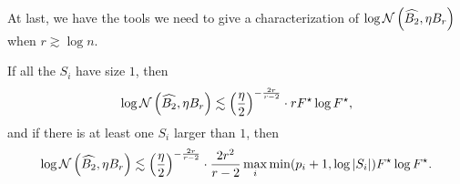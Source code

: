 \documentclass[11pt]{article}
\numberwithin{equation}{section}
\begin{document}
At last, we have the tools we need to give a characterization of $\log\mathcal{N}\left(\widehat{B_2},\eta B_r\right)$ when $r \gtrsim \log n$.

\begin{lemma}
\label{lemma:r_to_two_complicated}
If all the $S_i$ have size $1$, then
\begin{align*}
    \log\mathcal{N}\left(\widehat{B_2}, \eta B_r\right) \lesssim \left(\frac{\eta}{2}\right)^{-\frac{2r}{r-2}} \cdot rF^{\star}\log F^{\star},
\end{align*}
and if there is at least one $S_i$ larger than $1$, then
\begin{align*}
    \log\mathcal{N}\left(\widehat{B_2}, \eta B_r\right) \lesssim \left(\frac{\eta}{2}\right)^{-\frac{2r}{r-2}} \cdot \frac{2r^2}{r-2}\max_i \min(p_i+1, \log\left\lvert S_i \right\rvert)F^{\star}\log F^{\star}.
\end{align*}
\end{lemma}
\end{document}
